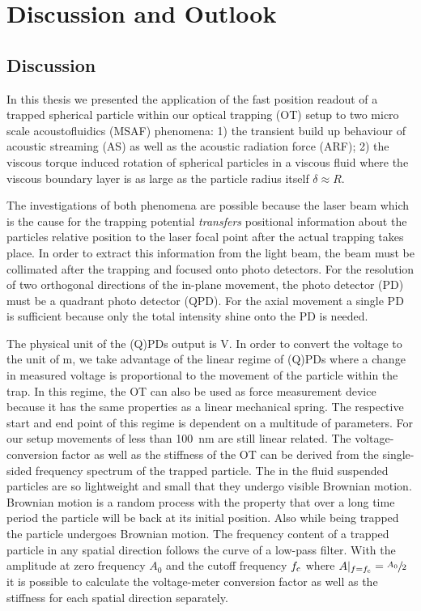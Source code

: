 \chapter[Discussion \& Outlook]{Discussion and Outlook}\label{ch:discussion}

\section{Discussion}
In this thesis we presented the application of the fast position readout of a 
trapped spherical particle within our optical trapping (OT) setup to two micro 
scale acoustofluidics (MSAF) phenomena: 1) the transient build up behaviour of 
acoustic streaming (AS) as well as the acoustic radiation force (ARF); 2) the 
viscous torque induced rotation of spherical particles in a viscous fluid where 
the viscous boundary layer is as large as the particle radius itself $\delta 
\approx R$.

The investigations of both phenomena are possible because the laser beam which 
is the cause for the trapping potential \emph{transfers} positional information 
about the particles relative position to the laser focal point after the actual 
trapping takes place. In order to extract this information from the light beam, 
the beam must be collimated after the trapping and focused onto photo 
detectors. For the resolution of two orthogonal directions of the in-plane 
movement, the photo detector (PD) must be a quadrant photo detector (QPD). For 
the axial movement a single PD is sufficient because only the total intensity 
shine onto the PD is needed.

The physical unit of the (Q)PDs output is \si{\volt}. In order to convert the 
voltage to the unit of \si{\meter}, we take advantage of the linear regime of 
(Q)PDs where a change in measured voltage is proportional to the movement of 
the particle within the trap. In this regime, the OT can also be used as force 
measurement device because it has the same properties as a linear mechanical 
spring. The respective start and end point of this regime is dependent on a 
multitude of parameters. For our setup movements of less than \SI{100}{\nm} are 
still linear related. The voltage-conversion factor as well as the stiffness of 
the OT can be derived from the single-sided frequency spectrum of the trapped 
particle. The in the fluid suspended particles are so lightweight and small 
that they undergo visible Brownian motion. Brownian motion is a random process 
with the property that over a long time period the particle will be back at its 
initial position. Also while being trapped the particle undergoes Brownian 
motion. The frequency content of a trapped particle in any spatial direction 
follows the curve of a low-pass filter. With the amplitude at zero frequency 
$A_{0}$ and the cutoff frequency $f_{\mathrm{c}}$ where 
$A\vert_{f=f_{\mathrm{c}}}=\sfrac{A_{0}}{2}$ it is possible to calculate the 
voltage-meter conversion factor as well as the stiffness for each spatial 
direction separately.

